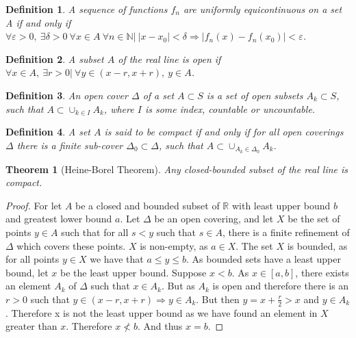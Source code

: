 \documentclass[12pt,oneside]{book}
\theoremstyle{mystyle}
\newtheorem{theorem}{Theorem}[section]
\newtheorem{definition}{Definition}[section]
\begin{document}
\begin{definition} A sequence of functions $f_n$ are uniformly equicontinuous on a set A if and only if $\forall\varepsilon>0,\ \exists \delta>0\ \forall x\in A\ \forall n\in\mathbb{N}|\ |x-x_0|<\delta \Rightarrow |f_n(x) - f_n(x_0)|<\varepsilon$.
\end{definition}

\begin{definition} A subset $A$ of the real line is open if $\forall x\in A,\ \exists r>0|\ \forall y \in (x-r,x+r),\ y\in A$.
\end{definition}

\begin{definition}
An open cover $\Delta$ of a set $A\subset S$ is a set of open subsets $A_k\subset S$, such that $A \subset \cup_{k\in I} A_k$, where $I$ is some index, countable or uncountable.
\end{definition}

\begin{definition}
A set $A$ is said to be compact if and only if for all open coverings $\Delta$ there is a finite sub-cover $\Delta_0\subset \Delta$, such that $A\subset \cup_{A_k \in \Delta_0} A_k$.
\end{definition}

\begin{theorem}[Heine-Borel Theorem]
Any closed-bounded subset of the real line is compact. 
\end{theorem}
\begin{proof}
For let $A$ be a closed and bounded subset of $\mathbb{R}$ with least upper bound $b$ and greatest lower bound $a$. Let $\Delta$ be an open covering, and let $X$ be the set of points $y\in A$ such that for all $s<y$ such that $s\in A$, there is a finite refinement of $\Delta$ which covers these points. $X$ is non-empty, as $a\in X$. The set $X$ is bounded, as for all points $y\in X$ we have that $a\leq y \leq b$. As bounded sets have a least upper bound, let $x$ be the least upper bound. Suppose $x<b$. As $x\in [a,b]$, there exists an element $A_k$ of $\Delta$ such that $x \in A_k$. But as $A_k$ is open and therefore there is an $r>0$ such that $y\in (x-r,x+r)\Rightarrow y \in A_k$. But then $y=x + \frac{r}{2} > x$ and $y\in A_k$. Therefore x is not the least upper bound as we have found an element in $X$ greater than $x$. Therefore $x\not<b$. And thus $x=b$.
\end{proof}
\end{document}
